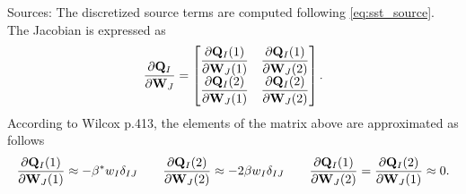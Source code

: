 \documentclass[oneside,a4paper,11pt]{report}
\begin{document}
Sources:
The discretized source terms are computed following \cref{eq:sst_source}. The Jacobian is expressed as
\begin{equation}
    \frac{\partial \mathbf{Q}_I}{\partial \mathbf{W}_J} = \begin{bmatrix}
    \dfrac{\partial \mathbf{Q}_I(1)}{\partial \mathbf{W}_J(1)} & \dfrac{\partial \mathbf{Q}_I(1)}{\partial \mathbf{W}_J(2)} \\
    \dfrac{\partial \mathbf{Q}_I(2)}{\partial \mathbf{W}_J(1)} & \dfrac{\partial \mathbf{Q}_I(2)}{\partial \mathbf{W}_J(2)} \end{bmatrix}.
\end{equation}
According to Wilcox p.\@ 413, the elements of the matrix above are approximated as follows
\begin{equation}
    \frac{\partial \mathbf{Q}_I(1)}{\partial \mathbf{W}_J(1)} \approx -\beta^* w_I \delta_{IJ} \qquad \frac{\partial \mathbf{Q}_I(2)}{\partial \mathbf{W}_J(2)} \approx - 2 \beta w_I \delta_{IJ} \qquad \frac{\partial \mathbf{Q}_I(1)}{\partial \mathbf{W}_J(2)} = \frac{\partial \mathbf{Q}_I(2)}{\partial \mathbf{W}_J(1)} \approx 0.
\end{equation}

\end{document}
